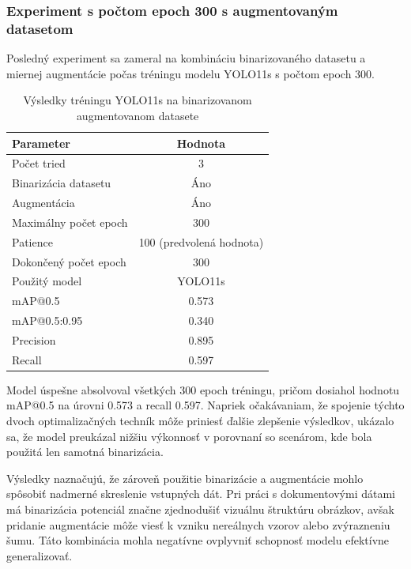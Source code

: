                 \subsubsection{Experiment s počtom epoch 300 s augmentovaným datasetom}

                Posledný experiment sa zameral na kombináciu binarizovaného datasetu a miernej augmentácie počas tréningu modelu YOLO11s s počtom epoch 300.

                \begin{table}[H]
                    \centering
                    \begin{tabular}{|l|c|}
                    \hline
                    \textbf{Parameter} & \textbf{Hodnota} \\ \hline
                    Počet tried & 3 \\ \hline
                    Binarizácia datasetu & Áno \\ \hline
                    Augmentácia & Áno \\ \hline
                    Maximálny počet epoch & 300 \\ \hline
                    Patience & 100 (predvolená hodnota) \\ \hline
                    Dokončený počet epoch & 300 \\ \hline
                    Použitý model & YOLO11s \\ \hline
                    mAP@0.5 & 0.573 \\ \hline
                    mAP@0.5:0.95 & 0.340 \\ \hline
                    Precision & 0.895 \\ \hline
                    Recall & 0.597 \\ \hline
                    \end{tabular}
                    \caption{Výsledky tréningu YOLO11s na binarizovanom augmentovanom datasete}
                    \label{tab:yolo11s_augmented_binary_300}
                \end{table}

                Model úspešne absolvoval všetkých 300 epoch tréningu, pričom dosiahol hodnotu mAP@0.5 na úrovni 0.573 a recall 0.597. Napriek očakávaniam, že spojenie týchto dvoch optimalizačných techník môže priniesť ďalšie zlepšenie výsledkov, ukázalo sa, že model preukázal nižšiu výkonnosť v porovnaní so scenárom, kde bola použitá len samotná binarizácia.

                Výsledky naznačujú, že zároveň použitie binarizácie a augmentácie mohlo spôsobiť nadmerné skreslenie vstupných dát. Pri práci s dokumentovými dátami má binarizácia potenciál značne zjednodušiť vizuálnu štruktúru obrázkov, avšak pridanie augmentácie môže viesť k vzniku nereálnych vzorov alebo zvýrazneniu šumu. Táto kombinácia mohla negatívne ovplyvniť schopnosť modelu efektívne generalizovať.

